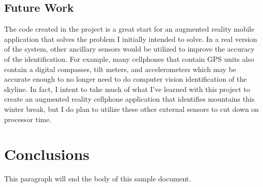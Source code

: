 \documentclass{acm_proc_article-sp}
\begin{document}
\subsection{Future Work}
    The code created in the project is a great start for an augmented reality mobile application that solves the problem I initially intended to solve.  In a real version of the system, other ancillary sensors would be utilized to improve the accuracy of the identification.  For example, many cellphones that contain GPS units also contain a digital compasses, tilt meters, and accelerometers which may be accurate enough to no longer need to do computer vision identification of the skyline.  In fact, I intent to take much of what I’ve learned with this project to create an augmented reality cellphone application that identifies mountains this winter break, but I do plan to utilize these other external sensors to cut down on processor time.






\section{Conclusions}
This paragraph will end the body of this sample document.



\end{document}
